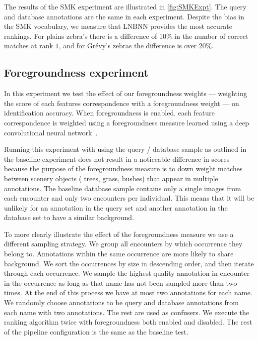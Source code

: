        The results of the SMK experiment are illustrated in \cref{fig:SMKExpt}.
        The query and database annotations are the same in each experiment.
        Despite the bias in the SMK vocabulary, we measure that LNBNN provides the most accurate rankings.
        For plains zebra's there is a difference of $10\percent$ in the number of correct matches at rank $1$,
          and for Grévy's zebras the difference is over $20\percent$.


    \subsection{Foregroundness experiment}\label{sub:exptfg}

        \ForegroundExpt{}

        In this experiment we test the effect of our foregroundness weights --- weighting the score of each
          features correspondence with a foregroundness weight --- on identification accuracy.
        When foregroundness is enabled, each feature correspondence is weighted using a foregroundness measure
          learned using a deep convolutional neural network~\cite{parham_photographic_2015}.

        Running this experiment with using the query / database sample as outlined in the baseline experiment
          does not result in a noticeable difference in scores because the purpose of the foregroundness measure is
          to down weight matches between scenery objects (\eg{} trees, grass, bushes) that appear in multiple
          annotations.
        The baseline database sample contains only a single images from each encounter and only two encounters
          per individual.
        This means that it will be unlikely for an annotation in the query set and another annotation in the
          database set to have a similar background.

        To more clearly illustrate the effect of the foregroundness measure we use a different sampling strategy.
        We group all encounters by which occurrence they belong to.
        Annotations within the same occurrence are more likely to share background.
        We sort the occurrences by size in descending order, and then iterate through each occurrence.
        We sample the highest quality annotation in encounter in the occurrence as long as that name has not been
          sampled more than two times.
        At the end of this process we have at most two annotations for each name.
        We randomly choose annotations to be query and database annotations from each name with two annotations.
        The rest are used as confusers.
        We execute the ranking algorithm twice with foregroundness both enabled and disabled.
        The rest of the pipeline configuration is the same as the baseline test.


